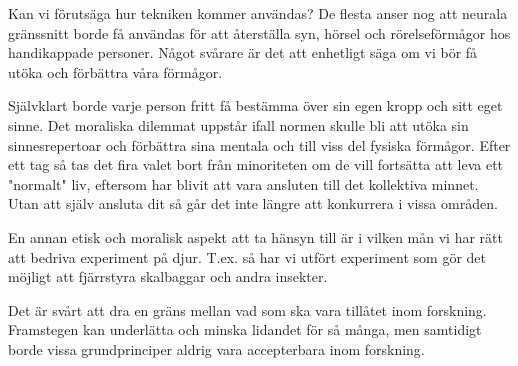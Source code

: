 \documentclass[12pt, a4paper]{article}
\begin{document}
Kan vi förutsäga hur tekniken kommer användas? De flesta anser nog att neurala
gränssnitt borde få användas för att återställa syn, hörsel och rörelseförmågor
hos handikappade personer. Något svårare är det att enhetligt säga om vi bör få
utöka och förbättra våra förmågor.

Självklart borde varje person fritt få bestämma över sin egen kropp och sitt
eget sinne. Det moraliska dilemmat uppstår ifall normen skulle bli att utöka sin
sinnesrepertoar och förbättra sina mentala och till viss del fysiska förmågor.
Efter ett tag så tas det fira valet bort från minoriteten om de vill fortsätta
att leva ett "normalt" liv, eftersom har blivit att vara ansluten till det
kollektiva minnet. Utan att själv ansluta dit så går det inte längre att
konkurrera i vissa områden. \cite{ethics_eu} \cite{ethics1}

En annan etisk och moralisk aspekt att ta hänsyn till är i vilken mån vi har
rätt att bedriva experiment på djur. T.ex. så har vi utfört experiment som gör
det möjligt att fjärrstyra skalbaggar och andra insekter. \cite{ethics2}

Det är svårt att dra en gräns mellan vad som ska vara tillåtet inom forskning.
Framstegen kan underlätta och minska lidandet för så många, men samtidigt borde
vissa grundprinciper aldrig vara accepterbara inom forskning.






%
%



\pagebreak


\end{document}

